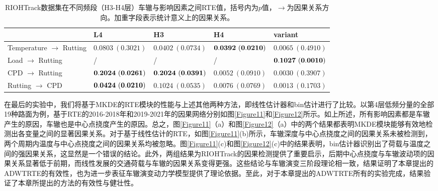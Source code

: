 \begin{table}[!ht]
\fontsize{6}{6}\selectfont
\centering
\caption{RIOHTrack数据集在不同频段（H3-H4层）车辙与影响因素之间RTE值，括号内为$p$值，$\rightarrow$为因果关系方向。加重字段表示统计意义上的因果关系。}
\begin{tabular}{lllll}
 \hline
   & L4 & H3 & H4 & variant \\
  \hline
  Temperature $\rightarrow$  Rutting &$0.0803\ (0.3021)$ &$0.0402\ (0.0734)$&$\bf{0.0392\ (0.0210)}$&$0.0065\ (0.4910)$\\
  \hline
  Load $\rightarrow$ Rutting&  /\ & /\ & /\ &$\bf{0.1027\ (0.0010)}$\\
  \hline
  CPD $\rightarrow$ Rutting& $\bf{0.2024\ (0.0261)}$&$\bf{0.2024\ (0.0391)}$&$0.0052\ (0.0910)$&$0.0030\ (0.3907)$\\
  \hline
  Rutting $\rightarrow$ CPD& $\bf{0.0424\ (0.0210)}$&$0.1024\ (0.0535)$&$0.0076\ (0.0769)$&$0.0013\ (0.1703)$\\
  \hline
\end{tabular}
\label{table7_1}
\end{table}
在最后的实验中，我们将基于MKDE的RTE模块的性能与上述其他两种方法，即线性估计器和bin估计进行了比较。以第4层低频分量的全部19种路面为例，基于RTE的2016-2018年和2019-2021年的因果网络分别如图\ref{Figure11}和\ref{Figure12}所示。如上所述，所有影响因素都是车辙产生的原因，车辙也是中心点挠度产生的原因。总之，图\ref{Figure11}（a）和图\ref{Figure12}（a）中的两个结果都表明MKDE模块能够有效地检测出各变量之间的显著因果关系。对于基于线性估计的RTE，如图\ref{Figure11}(b)所示，车辙深度与中心点挠度之间的因果关系未被检测到，两个周期内温度与中心点挠度之间的因果关系均被忽略。图\ref{Figure11}(c)和图\ref{Figure12}(c)中的结果表明，bin估计器识别出了荷载与温度之间的强因果关系，这显然是一个错误的结论。此外，两组结果为RIOHTrack的因果检测提供了重要启示，后期中心点挠度与车辙波动项的因果关系显著低于前期，而线性发展的交通荷载与车辙的因果关系变得更强。这些结论与车辙演变三阶段理论相一致，结果证明了本章提出的ADWTRTE的有效性，也为进一步表征车辙演变动力学模型提供了理论依据。至此，对于本章提出的ADWTRTE所有的实验完成，结果验证了本章所提出的方法的有效性与健壮性。

